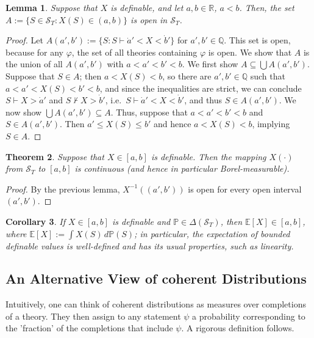 \documentclass[12pt]{article}
\newcommand{\PP}{\mathbb{P}}
\newcommand{\vp}{\varphi}
\newcommand{\EE}{\mathbb{E}}
\newcommand{\RR}{\mathbb{R}}
\newcommand{\QQ}{\mathbb{Q}}
\newcommand{\cS}{\mathcal{S}}
\theoremstyle{plain}
\newtheorem{theorem}{Theorem}[subsection]
\newtheorem{lemma}[theorem]{Lemma}
\newtheorem{corollary}[theorem]{Corollary}
\theoremstyle{definition}
\theoremstyle{remark}
\begin{document}
\begin{lemma}
Suppose that $X$ is definable, and let $a,b\in\RR$, $a<b$. Then, the set $A := \{S\in\cS_T : X(S) \in (a,b)\}$ is open in $\cS_T$.
\end{lemma}
\begin{proof}
Let $A(a',b') := \{S : S\vdash\dot a' < X < \dot b'\}$ for $a',b'\in\QQ$. This set is open, because for any $\vp$, the set of all theories containing $\vp$ is open. We show that $A$ is the union of all $A(a',b')$ with $a < a' < b' < b$.
We first show $A \subseteq \bigcup A(a',b')$. Suppose that $S\in A$; then $a < X(S) < b$, so there are $a',b'\in\QQ$ such that $a<a'<X(S)<b'<b$, and since the inequalities are strict, we can conclude $S\vdash X > \dot a'$ and $S\nvdash X > \dot b'$, i.e.\ $S\vdash\dot a' < X < \dot b'$, and thus $S\in A(a',b')$.
We now show $\bigcup A(a',b')\subseteq A$. Thus, suppose that $a < a' < b' < b$ and $S\in A(a',b')$. Then $a' \le X(S) \le b'$ and hence $a < X(S) < b$, implying $S\in A$.
\end{proof}
\begin{theorem}
Suppose that $X\in[a,b]$ is definable. Then the mapping $X(\cdot)$ from $\cS_T$ to $[a,b]$ is continuous (and hence in particular Borel-measurable).
\end{theorem}
\begin{proof}
By the previous lemma, $X^{-1}((a',b'))$ is open for every open interval $(a',b')$.
\end{proof}
\begin{corollary}
If $X\in[a,b]$ is definable and $\PP\in\Delta(\cS_T)$, then $\EE[X]\in[a,b]$, where $\EE[X] := \int X(S)\,d\PP(S)$; in particular, the expectation of bounded definable values is well-defined and has its usual properties, such as linearity.
\end{corollary}
\subsection{An Alternative View of coherent Distributions} \label{An Alternative View of coherent Distributions}
Intuitively, one can think of coherent distributions as measures over completions of a theory. They then assign to any statement $\psi$ a probability corresponding to the 'fraction' of the completions that include $\psi$. A rigorous definition follows.
\end{document}
